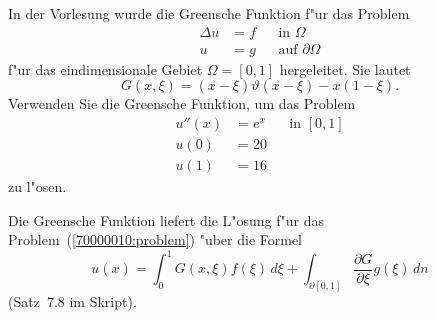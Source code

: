 In der Vorlesung wurde die Greensche Funktion f"ur das Problem
\[
\begin{aligned}
\Delta u&= f & &\text{in $\Omega$}\\
       u&= g & &\text{auf $\partial\Omega$}
\end{aligned}
\]
f"ur das eindimensionale Gebiet  $\Omega=[0,1]$ hergeleitet.
Sie lautet 
\[
G(x,\xi) = (x-\xi)\vartheta(x-\xi) -x(1-\xi).
\]
Verwenden Sie die Greensche Funktion, um das Problem
\[
\begin{aligned}
u''(x)& = e^x& &\text{in $[0,1]$}\\
  u(0)& =  20& &\\
  u(1)& =  16& &
\end{aligned}
\label{70000010:problem}
\]
zu l"osen.

\begin{loesung}
Die Greensche Funktion liefert die L"osung f"ur das
Problem~(\ref{70000010:problem}) "uber die Formel
\begin{equation}
u(x)
=
\int_0^1 G(x,\xi) f(\xi)\,d\xi
+
\int_{\partial[0,1]}\frac{\partial G}{\partial \xi} g(\xi)\,dn
\label{70000010:green}
\end{equation}
(Satz~7.8 im Skript). 


\end{loesung}
